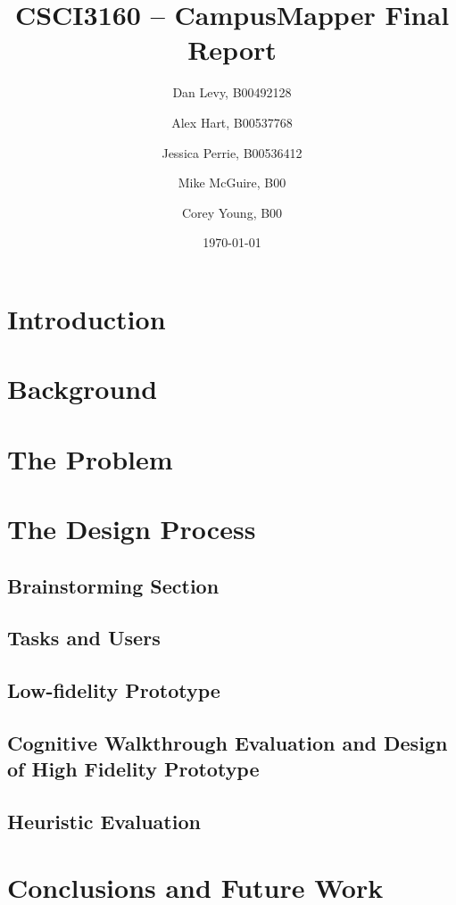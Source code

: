 \documentclass{report}
\title{CSCI3160 -- CampusMapper Final Report}
\author{Dan Levy, B00492128 \and Alex Hart, B00537768 \and Jessica Perrie,
B00536412 \and Mike McGuire, B00 \and Corey Young, B00}
\date{\today}
\begin{document}
\maketitle
\tableofcontents
\chapter{Introduction}
\chapter{Background}
\chapter{The Problem}
\chapter{The Design Process}
\section{Brainstorming Section}
\section{Tasks and Users}
\section{Low-fidelity Prototype}
\section{Cognitive Walkthrough Evaluation and Design of High Fidelity
Prototype}
\section{Heuristic Evaluation}
\chapter{Conclusions and Future Work}
{}

\end{document}
